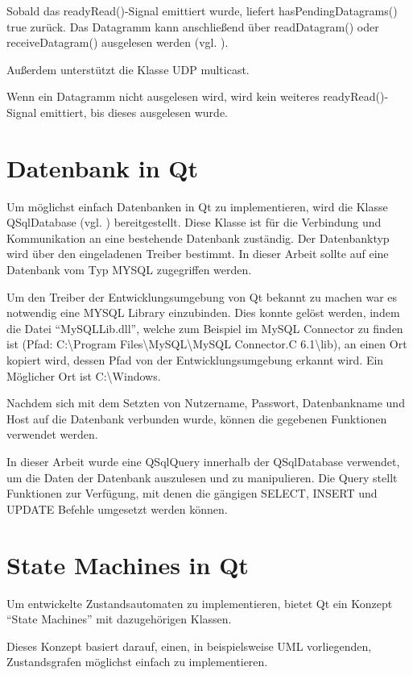 Sobald das readyRead()-Signal emittiert wurde, liefert hasPendingDatagrams() true zurück. Das Datagramm kann anschließend über readDatagram() oder receiveDatagram() ausgelesen werden (vgl. \cite{qt_socket}).

Außerdem unterstützt die Klasse UDP multicast.

Wenn ein Datagramm nicht ausgelesen wird, wird kein weiteres readyRead()-Signal emittiert, bis dieses ausgelesen wurde. 

\section{Datenbank in Qt}
\label{sec:QTDatabase}

Um möglichst einfach Datenbanken in Qt zu implementieren, wird die Klasse QSqlDatabase (vgl. \cite{qt_database}) bereitgestellt. Diese Klasse ist für die Verbindung und Kommunikation an eine bestehende Datenbank zuständig. Der Datenbanktyp wird über den eingeladenen Treiber bestimmt. In dieser Arbeit sollte auf eine Datenbank vom Typ MYSQL zugegriffen werden.

Um den Treiber der Entwicklungsumgebung von Qt bekannt zu machen war es notwendig eine MYSQL Library einzubinden. Dies konnte gelöst werden, indem die Datei "`MySQLLib.dll"', welche zum Beispiel im MySQL Connector zu finden ist (Pfad: C:\textbackslash Program Files\textbackslash MySQL\textbackslash MySQL Connector.C 6.1\textbackslash lib), an einen Ort kopiert wird, dessen Pfad von der Entwicklungsumgebung erkannt wird. Ein Möglicher Ort ist C:\textbackslash Windows. 

Nachdem sich mit dem Setzten von Nutzername, Passwort, Datenbankname und Host auf die Datenbank verbunden wurde, können die gegebenen Funktionen verwendet werden. 

In dieser Arbeit wurde eine QSqlQuery innerhalb der QSqlDatabase verwendet, um die Daten der Datenbank auszulesen und zu manipulieren. Die Query stellt Funktionen zur Verfügung, mit denen die gängigen SELECT, INSERT und UPDATE Befehle umgesetzt werden können.  

\section{State Machines in Qt}
\label{sec:StateMachines}

Um entwickelte Zustandsautomaten zu implementieren, bietet Qt ein Konzept "`State Machines"' mit dazugehörigen Klassen. 

Dieses Konzept basiert darauf, einen, in beispielsweise UML vorliegenden, Zustandsgrafen möglichst einfach zu implementieren. 

